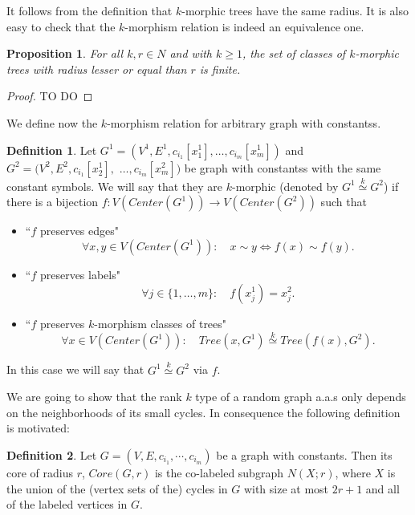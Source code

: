 \documentclass[11pt,notitlepage]{report}
\newtheorem{proposition}{Proposition}[chapter]
\theoremstyle{definition}
\newtheorem{definition}{Definition}[chapter]
\theoremstyle{remark}
\newcommand{\clist}{c_{i_1}, \cdots, c_{i_m}}
\newcommand{\morph}[1]{\stackrel{#1}{\simeq}}
\begin{document}
It follows from the definition that $k$-morphic trees have the same radius. 
It is also easy to check that the $k$-morphism relation is indeed an equivalence one. 

\begin{proposition}
	For all $k,r\in N$ and with $k\geq 1$, the set of classes of $k$-morphic trees
	with radius lesser or equal than $r$ is finite.
\end{proposition}
\begin{proof}
TO DO
\end{proof}

We define now the $k$-morphism relation for arbitrary graph with constantss. 

\begin{definition}
	Let $G^1=(V^1,E^1,c_{i_1}[x^1_1],\dots, c_{i_m}[x_m^1])$ and  $G^2=(V^2,E^2,c_{i_1}[x^1_2],$ 
	$\dots, c_{i_m}[x_m^2])$ be graph with constantss with the same constant symbols. 
	We will say that they are $k$-morphic (denoted by $G^1 \morph{k}G^2$) if there is
	a bijection $f: V(Center(G^1))\rightarrow V(Center(G^2))$ such that
	\begin{itemize}
		\item ``$f$ preserves edges"
		\[\forall x,y\in V(Center(G^1)): \quad  x\sim y \iff f(x)\sim f(y). \]
		\item ``$f$ preserves labels"
		\[\forall j\in \{1,\dots,m\}: \quad f(x^1_j) = x^2_j.\]
		\item ``$f$ preserves $k$-morphism classes of trees"
		\[\forall x\in V(Center(G^1)): \quad  Tree(x,G^1)\morph{k} Tree(f(x),G^2).\]
	\end{itemize}
	In this case we will say that $G^1 \morph{k} G^2$ via $f$. 	
\end{definition}

We are going to show that the rank $k$ type of a random graph a.a.s only 
depends on the neighborhoods of its small cycles. In consequence the following definition
is motivated:

\begin{definition} 
	Let $G=(V,E,\clist)$ be a graph with constants. Then its core of radius $r$, $Core(G,r)$
	is the co-labeled subgraph $N(X;r)$, where $X$ is the union of the (vertex sets of the)
	cycles in $G$ with size at most $2r+1$ and all of the labeled vertices in $G$. 
\end{definition}
\end{document}
